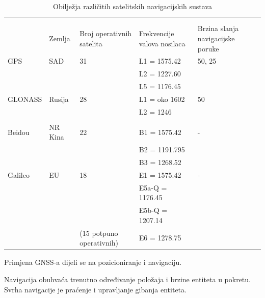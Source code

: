 \documentclass[a4paper,twoside,12pt]{memoir} %
\begin{document}
\begin{intro}
	\begin{table}[H]
		\caption{Obilježja različitih satelitskih navigacijskih sustava}
		\begin{center}
			\begin{tabular}{|lllll|}
				\hline
				\rowcolor{lightgray}&  &  & &  \\
				\rowcolor{lightgray}&  &  & &  \\
				 \multirow{-3}{1cm}{ \cellcolor{lightgray}	} & \multirow{-3}{2cm}{\cellcolor{lightgray} Zemlja} & 
				 \multirow{-3}{2cm}{ \cellcolor{lightgray}Broj operativnih satelita} & \multirow{-3}{3cm}{\cellcolor{lightgray} Frekvencije valova nosilaca} & \multirow{-3}{3cm}{\cellcolor{lightgray} Brzina slanja navigacijske poruke} \\
				\hline\hline
				GPS & SAD & 31 & {L1 = 1575.42}
				& 50, 25 \\
				 &  &  & L2 = 1227.60 &  \\
				 &  &  & L5 = 1176.45 &  \\
				\hline
				GLONASS & Rusija & 28 & {L1 = oko 1602}
				& 50 \\
				 &  &  & L2 = 1246 &  \\
				 &  &  &&  \\
				\hline
				Beidou & NR Kina & 22 & {B1 = 1575.42}
				& - \\
				&  &  & B2 = 1191.795 &  \\
				&  &  & B3 = 1268.52 &  \\
				\hline
				Galileo & EU & 18 & {E1 = 1575.42}
				& - \\
				&  &  & E5a-Q = 1176.45 &  \\
				&  &  & E5b-Q = 1207.14 &  \\
				&  & \multirow{-3}{2.5cm}{(15 potpuno operativnih)} & E6 = 1278.75 &  \\
				\hline
			\end{tabular}
		\end{center}
		\label{tab:multicol}
	\end{table}
	
	Primjena GNSS-a dijeli se na pozicioniranje i navigaciju.
	\begin{defn}[Navigacija]
		Navigacija obuhvaća trenutno određivanje položaja i brzine entiteta u pokretu.
		Svrha navigacije je praćenje i upravljanje gibanja entiteta.
	\end{defn}
	

\end{intro}
\end{document}
